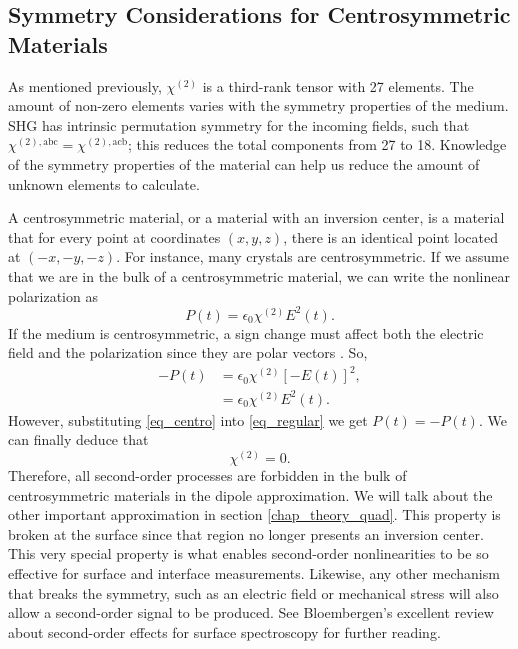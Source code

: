 
\subsection{Symmetry Considerations for Centrosymmetric Materials}
\label{chap_theory_sym}

As mentioned previously, $\chi^{(2)}$ is a third-rank tensor with 27 elements.
The amount of non-zero elements varies with the symmetry properties of the
medium. SHG has intrinsic permutation symmetry for the incoming fields, such
that $\chi^{(2),\mathrm{abc}} = \chi^{(2),\mathrm{acb}}$; this reduces the total
components from 27 to 18. Knowledge of the symmetry properties of the material
can help us reduce the amount of unknown elements to calculate.

A centrosymmetric material, or a material with an inversion center, is a
material that for every point at coordinates $(x,y,z)$, there is an identical
point located at $(-x,-y,-z)$. For instance, many crystals are centrosymmetric.
If we assume that we are in the bulk of a centrosymmetric material, we can write
the nonlinear polarization as
\begin{equation}
{P}(t) = \epsilon_{0}\chi^{(2)}{E}^{2}(t).\label{eq_regular}
\end{equation}
If the medium is centrosymmetric, a sign change must affect both the electric
field and the polarization since they are polar vectors \cite{jacksonbook}. So,
\begin{align}
-{P}(t) &= \epsilon_{0}\chi^{(2)}\left[-{E}(t)\right]^{2},\\
              &= \epsilon_{0}\chi^{(2)}{E}^{2}(t).\label{eq_centro}
\end{align}
However, substituting \eqref{eq_centro} into \eqref{eq_regular} we get ${P}(t) =
-{P}(t)$. We can finally deduce that
\begin{equation}
\chi^{(2)} = 0.
\end{equation}
Therefore, all second-order processes are forbidden in the bulk of
centrosymmetric materials in the dipole approximation. We will talk about the
other important approximation in section \ref{chap_theory_quad}. This property
is broken at the surface since that region no longer presents an inversion
center.  This very special property is what enables second-order nonlinearities
to be so effective for surface and interface measurements. Likewise, any other
mechanism that breaks the symmetry, such as an electric field or mechanical
stress will also allow a second-order signal to be produced. See Bloembergen's
\cite{bloembergen1999surface} excellent review about second-order effects for
surface spectroscopy for further reading.



